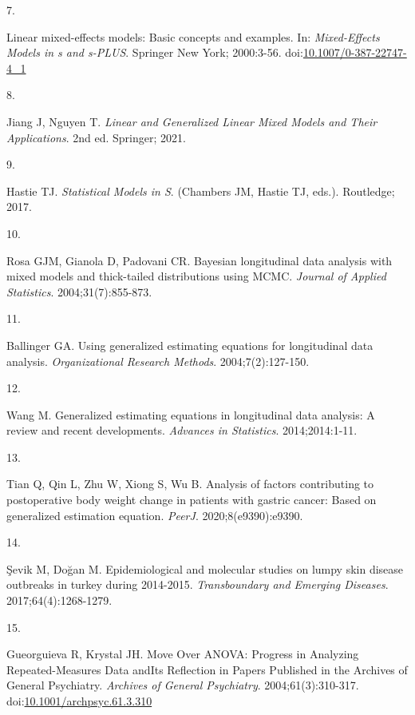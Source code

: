 \documentclass[
]{article}
\newlength{\cslhangindent}
\newlength{\csllabelwidth}
\newlength{\cslentryspacingunit} %
\newenvironment{CSLReferences}[2] %
 {%
  \setlength{\parindent}{0pt}
  \ifodd #1
  \let\oldpar\par
  \def\par{\hangindent=\cslhangindent\oldpar}
  \fi
  \setlength{\parskip}{#2\cslentryspacingunit}
 }%
 {}
\newcommand{\CSLLeftMargin}[1]{\parbox[t]{\csllabelwidth}{#1}}
\newcommand{\CSLRightInline}[1]{\parbox[t]{\linewidth - \csllabelwidth}{#1}\break}
\begin{document}
\begin{CSLReferences}{0}{0}
\leavevmode{}%
\CSLLeftMargin{7. }%
\CSLRightInline{Linear mixed-effects models: Basic concepts and
examples. In: \emph{Mixed-Effects Models in s and s-PLUS}. Springer New
York; 2000:3-56.
doi:\href{https://doi.org/10.1007/0-387-22747-4_1}{10.1007/0-387-22747-4\_1}}

\leavevmode{}%
\CSLLeftMargin{8. }%
\CSLRightInline{Jiang J, Nguyen T. \emph{Linear and Generalized Linear
Mixed Models and Their Applications}. 2nd ed. Springer; 2021.}

\leavevmode{}%
\CSLLeftMargin{9. }%
\CSLRightInline{Hastie TJ. \emph{Statistical Models in {S}}. (Chambers
JM, Hastie TJ, eds.). Routledge; 2017.}

\leavevmode{}%
\CSLLeftMargin{10. }%
\CSLRightInline{Rosa GJM, Gianola D, Padovani CR. Bayesian longitudinal
data analysis with mixed models and thick-tailed distributions using
{MCMC}. \emph{Journal of Applied Statistics}. 2004;31(7):855-873.}

\leavevmode{}%
\CSLLeftMargin{11. }%
\CSLRightInline{Ballinger GA. Using generalized estimating equations for
longitudinal data analysis. \emph{Organizational Research Methods}.
2004;7(2):127-150.}

\leavevmode{}%
\CSLLeftMargin{12. }%
\CSLRightInline{Wang M. Generalized estimating equations in longitudinal
data analysis: A review and recent developments. \emph{Advances in
Statistics}. 2014;2014:1-11.}

\leavevmode{}%
\CSLLeftMargin{13. }%
\CSLRightInline{Tian Q, Qin L, Zhu W, Xiong S, Wu B. Analysis of factors
contributing to postoperative body weight change in patients with
gastric cancer: Based on generalized estimation equation. \emph{PeerJ}.
2020;8(e9390):e9390.}

\leavevmode{}%
\CSLLeftMargin{14. }%
\CSLRightInline{Şevik M, Doğan M. Epidemiological and molecular studies
on lumpy skin disease outbreaks in turkey during 2014-2015.
\emph{Transboundary and Emerging Diseases}. 2017;64(4):1268-1279.}

\leavevmode{}%
\CSLLeftMargin{15. }%
\CSLRightInline{Gueorguieva R, Krystal JH. {Move Over ANOVA: Progress in
Analyzing Repeated-Measures Data andIts Reflection in Papers Published
in the Archives of General Psychiatry}. \emph{Archives of General
Psychiatry}. 2004;61(3):310-317.
doi:\href{https://doi.org/10.1001/archpsyc.61.3.310}{10.1001/archpsyc.61.3.310}}


\end{CSLReferences}
\end{document}
